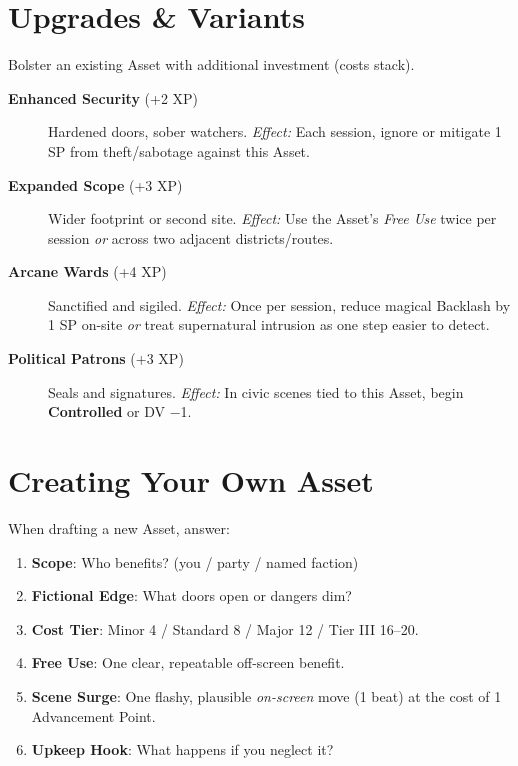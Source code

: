 \section{Upgrades \& Variants}
Bolster an existing Asset with additional investment (costs stack).
\begin{description}
  \item[\textbf{Enhanced Security} (+2 XP)]  Hardened doors, sober watchers. \emph{Effect:} Each session, ignore or mitigate 1 SP from theft/sabotage against this Asset.
  \item[\textbf{Expanded Scope} (+3 XP)]  Wider footprint or second site. \emph{Effect:} Use the Asset’s \emph{Free Use} twice per session \emph{or} across two adjacent districts/routes.
  \item[\textbf{Arcane Wards} (+4 XP)]  Sanctified and sigiled. \emph{Effect:} Once per session, reduce magical Backlash by 1 SP on-site \emph{or} treat supernatural intrusion as one step easier to detect.
  \item[\textbf{Political Patrons} (+3 XP)]  Seals and signatures. \emph{Effect:} In civic scenes tied to this Asset, begin \textbf{Controlled} or DV −1.
\end{description}

\section{Creating Your Own Asset}
When drafting a new Asset, answer:
\begin{enumerate}
  \item \textbf{Scope}: Who benefits? (you / party / named faction)
  \item \textbf{Fictional Edge}: What doors open or dangers dim?
  \item \textbf{Cost Tier}: Minor 4 / Standard 8 / Major 12 / Tier III 16–20.
  \item \textbf{Free Use}: One clear, repeatable off-screen benefit.
  \item \textbf{Scene Surge}: One flashy, plausible \emph{on-screen} move (1 beat) at the cost of 1 Advancement Point.
  \item \textbf{Upkeep Hook}: What happens if you neglect it?
\end{enumerate}

